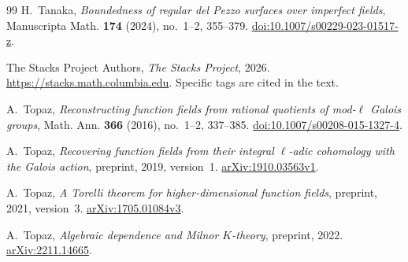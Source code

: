 \begin{thebibliography}{99}
H.~Tanaka,
\emph{Boundedness of regular del Pezzo surfaces over imperfect fields},
Manuscripta Math. \textbf{174} (2024), no.~1--2, 355--379.
\href{https://doi.org/10.1007/s00229-023-01517-z}{doi:10.1007/s00229-023-01517-z}.

The Stacks Project Authors,
\emph{The Stacks Project}, 2026.
\url{https://stacks.math.columbia.edu}.
Specific tags are cited in the text.

A.~Topaz,
\emph{Reconstructing function fields from rational quotients of mod-$\ell$ Galois groups},
Math. Ann. \textbf{366} (2016), no.~1--2, 337--385.
\href{https://doi.org/10.1007/s00208-015-1327-4}{doi:10.1007/s00208-015-1327-4}.

A.~Topaz,
\emph{Recovering function fields from their integral $\ell$-adic cohomology with the Galois action},
preprint, 2019, version~1.
\href{https://arxiv.org/abs/1910.03563v1}{arXiv:1910.03563v1}.

A.~Topaz,
\emph{A Torelli theorem for higher-dimensional function fields},
preprint, 2021, version~3.
\href{https://arxiv.org/abs/1705.01084v3}{arXiv:1705.01084v3}.

A.~Topaz,
\emph{Algebraic dependence and Milnor $K$-theory},
preprint, 2022.
\href{https://arxiv.org/abs/2211.14665}{arXiv:2211.14665}.

\end{thebibliography}
